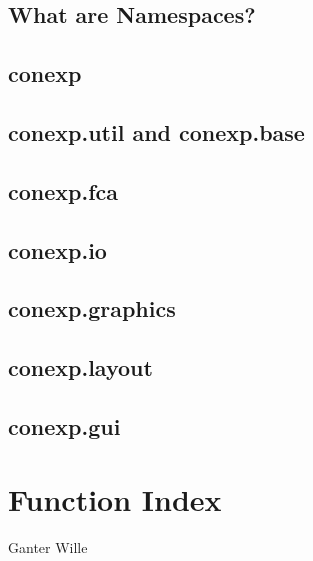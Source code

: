 \documentclass{scrbook}
\theoremstyle{plain}
\theoremstyle{plain}
\theoremstyle{plain}
\theoremstyle{nonumberplain}
\begin{document}
\section{What are Namespaces?}

\section{conexp}

\section{conexp.util and conexp.base}

\section{conexp.fca}

\section{conexp.io}

\section{conexp.graphics}

\section{conexp.layout}

\section{conexp.gui}


\chapter{Function Index}




\appendix

\begin{thebibliography}{xxxxxxx}
 Ganter Wille
\end{thebibliography}
\end{document}
